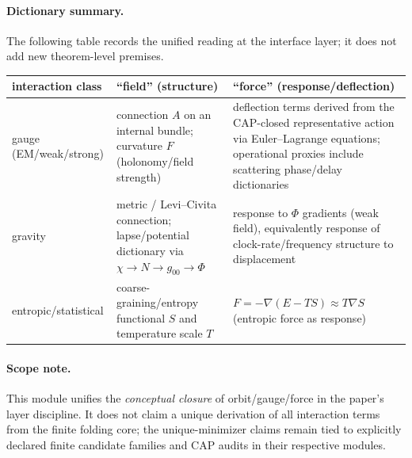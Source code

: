 \paragraph{Dictionary summary.}
\InterfaceTag The following table records the unified reading at the interface layer; it does not add new theorem-level premises.
\begin{center}
\begin{tabular}{p{} p{} p{}}
\toprule
interaction class & ``field'' (structure) & ``force'' (response/deflection) \\
\midrule
gauge (EM/weak/strong) &
connection $A$ on an internal bundle; curvature $F$ (holonomy/field strength) &
deflection terms derived from the CAP-closed representative action via Euler--Lagrange equations; operational proxies include scattering phase/delay dictionaries \\
gravity &
metric / Levi--Civita connection; lapse/potential dictionary via $\chi\to N\to g_{00}\to\Phi$ &
response to $\Phi$ gradients (weak field), equivalently response of clock-rate/frequency structure to displacement \\
entropic/statistical &
coarse-graining/entropy functional $S$ and temperature scale $T$ &
$F=-\nabla(E-TS)\approx T\nabla S$ (entropic force as response) \\
\bottomrule
\end{tabular}
\end{center}

\paragraph{Scope note.}
\AuditTag This module unifies the \emph{conceptual closure} of orbit/gauge/force in the paper's layer discipline.
It does not claim a unique derivation of all interaction terms from the finite folding core; the unique-minimizer claims remain tied to explicitly declared finite candidate families and CAP audits in their respective modules.
